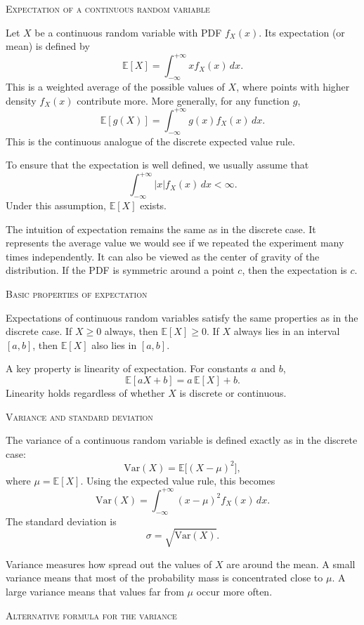 \bigskip\textsc{Expectation of a continuous random variable}

Let \(X\) be a continuous random variable with PDF \(f_X(x)\).  
Its expectation (or mean) is defined by
\[
\mathbb{E}[X] = \int_{-\infty}^{+\infty} x f_X(x) \, dx.
\]
This is a weighted average of the possible values of \(X\), where points with higher density \(f_X(x)\) contribute more.  
More generally, for any function \(g\),
\[
\mathbb{E}[g(X)] = \int_{-\infty}^{+\infty} g(x) f_X(x) \, dx.
\]
This is the continuous analogue of the discrete expected value rule.  

To ensure that the expectation is well defined, we usually assume that
\[
\int_{-\infty}^{+\infty} |x| f_X(x) \, dx < \infty.
\]
Under this assumption, \(\mathbb{E}[X]\) exists.  

The intuition of expectation remains the same as in the discrete case.  
It represents the average value we would see if we repeated the experiment many times independently.  
It can also be viewed as the center of gravity of the distribution.  
If the PDF is symmetric around a point \(c\), then the expectation is \(c\).

\bigskip\textsc{Basic properties of expectation}

Expectations of continuous random variables satisfy the same properties as in the discrete case.  
If \(X \ge 0\) always, then \(\mathbb{E}[X] \ge 0\).  
If \(X\) always lies in an interval \([a,b]\), then \(\mathbb{E}[X]\) also lies in \([a,b]\).

A key property is linearity of expectation.  
For constants \(a\) and \(b\),
\[
\mathbb{E}[aX + b] = a\,\mathbb{E}[X] + b.
\]
Linearity holds regardless of whether \(X\) is discrete or continuous.  

\bigskip\textsc{Variance and standard deviation}

The variance of a continuous random variable is defined exactly as in the discrete case:
\[
\mathrm{Var}(X) = \mathbb{E}\big[(X - \mu)^2\big],
\]
where \(\mu = \mathbb{E}[X]\).  
Using the expected value rule, this becomes
\[
\mathrm{Var}(X) = \int_{-\infty}^{+\infty} (x - \mu)^2 f_X(x) \, dx.
\]
The standard deviation is
\[
\sigma = \sqrt{\mathrm{Var}(X)}.
\]

Variance measures how spread out the values of \(X\) are around the mean.  
A small variance means that most of the probability mass is concentrated close to \(\mu\).  
A large variance means that values far from \(\mu\) occur more often.

\bigskip\textsc{Alternative formula for the variance}

